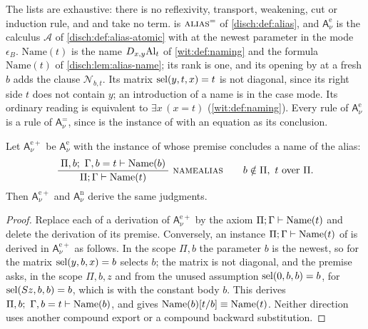 The lists are exhaustive: there is no reflexivity, transport, weakening,
cut or induction rule, and  and  take no term.
 is $\rulename{Alias}^{=}$
of \cref{disch:def:alias}, and $\mathsf{A}^{\mathrm e}_{\nu}$ is the calculus
$\mathcal A$ of \cref{disch:def:alias-atomic} with  at the
newest parameter in the mode $\epsilon_B$.  $\mathrm{Name}(t)$ is the name
$D_{x,y}\mathrm{Al}_t$ of \cref{wit:def:naming} and the formula
$\mathrm{Name}(t)$ of \cref{disch:lem:alias-name}; its rank is one, and its
opening by  at a fresh $b$ adds the clause
$\mathcal N_{b,t}$.  Its matrix $\operatorname{sel}(y,t,x)=t$ is not diagonal, since its
right side $t$ does not contain $y$; an introduction of a name is in the
case mode.  Its ordinary reading is equivalent to $\exists x\,(x=t)$
(\cref{wit:def:naming}).  Every rule of $\mathsf{A}^{\mathrm e}_{\nu}$ is a
rule of $\mathsf{A}^{=}_{\nu}$, since  is the instance of
 with an equation as its conclusion.

\begin{lemma}
\label{wit:lem:ns-shape}
Let $\mathsf{A}^{\mathrm e+}_{\nu}$ be $\mathsf{A}^{\mathrm e}_{\nu}$ with
the instance of  whose premise concludes a name of the
alias:
\[
 \infrule{\Pi,b;\ \Gamma,b=t\proves\mathrm{Name}(b)}
         {\Pi;\Gamma\proves\mathrm{Name}(t)}\ \rulename{NameAlias}
 \qquad b\notin\Pi,\ t\text{ over }\Pi .
\]
Then $\mathsf{A}^{\mathrm e+}_{\nu}$ and $\mathsf{A}^{\mathrm n}_{\nu}$
derive the same judgments.
\end{lemma}

\begin{proof}
Replace each  of a derivation of
$\mathsf{A}^{\mathrm e+}_{\nu}$ by the axiom $\Pi;\Gamma\vdash\mathrm{Name}(t)$
and delete the derivation of its premise.  Conversely, an instance
$\Pi;\Gamma\vdash\mathrm{Name}(t)$ of  is derived in
$\mathsf{A}^{\mathrm e+}_{\nu}$ as follows.  In the scope $\Pi,b$ the
parameter $b$ is the newest, so  for the matrix
$\operatorname{sel}(y,b,x)=b$ selects $b$; the matrix is not diagonal, and the premise asks,
in the scope $\Pi,b,z$ and from the unused assumption $\operatorname{sel}(0,b,b)=b$, for
$\operatorname{sel}(S z,b,b)=b$, which is  with the constant body $b$.  This
derives $\Pi,b;\ \Gamma,b=t\proves\mathrm{Name}(b)$, and 
gives $\mathrm{Name}(b)[t/b]\equiv\mathrm{Name}(t)$.  Neither direction
uses another compound export or a compound backward substitution.
\end{proof}

